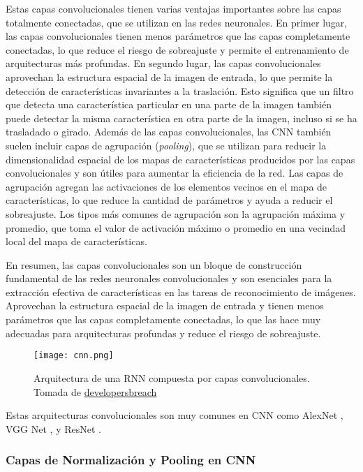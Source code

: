 \documentclass[10pt, oneside, a4paper]{article}
\begin{document}
	Estas capas convolucionales tienen varias ventajas importantes sobre las capas totalmente conectadas, que se utilizan en las redes neuronales. En primer lugar, las capas convolucionales tienen menos parámetros que las capas completamente conectadas, lo que reduce el riesgo de sobreajuste y permite el entrenamiento de arquitecturas más profundas. En segundo lugar, las capas convolucionales aprovechan la estructura espacial de la imagen de entrada, lo que permite la detección de características invariantes a la traslación. Esto significa que un filtro que detecta una característica particular en una parte de la imagen también puede detectar la misma característica en otra parte de la imagen, incluso si se ha trasladado o girado.
	Además de las capas convolucionales, las CNN también suelen incluir capas de agrupación (\textsl{pooling}), que se utilizan para reducir la dimensionalidad espacial de los mapas de características producidos por las capas convolucionales y son útiles para aumentar la eficiencia de la red. Las capas de agrupación agregan las activaciones de los elementos vecinos en el mapa de características, lo que reduce la cantidad de parámetros y ayuda a reducir el sobreajuste. Los tipos más comunes de agrupación son la agrupación máxima y promedio, que toma el valor de activación máximo o promedio en una vecindad local del mapa de características.
	
	En resumen, las capas convolucionales son un bloque de construcción fundamental de las redes neuronales convolucionales y son esenciales para la extracción efectiva de características en las tareas de reconocimiento de imágenes. Aprovechan la estructura espacial de la imagen de entrada y tienen menos parámetros que las capas completamente conectadas, lo que las hace muy adecuadas para arquitecturas profundas y reduce el riesgo de sobreajuste.
	
	\begin{figure}[H]
		\texttt{[image: cnn.png]}
		\caption{{\small Arquitectura de una RNN compuesta por capas convolucionales. Tomada de \href{https://developersbreach.com/convolution-neural-network-deep-learning/}{developersbreach}}}
		\label{fig:cnn_1}
	\end{figure}
	
	Estas arquitecturas convolucionales son muy comunes en CNN como AlexNet \cite{AlexNet}, VGG Net \cite{VGG16}, y ResNet \cite{resnet}.
	
	\subsubsection{Capas de Normalización y Pooling en CNN}
	
\end{document}

